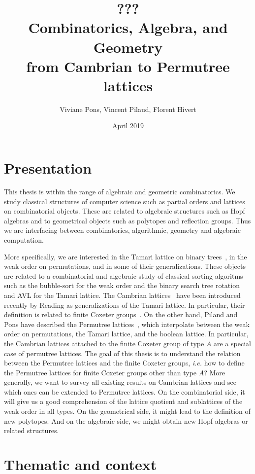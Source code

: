 \documentclass[a4paper,12pt]{article}
\title{\huge \bf ???  \\ Combinatorics, Algebra, and Geometry \\ from Cambrian to Permutree lattices}
\author{Viviane Pons, Vincent Pilaud, Florent Hivert}
\date{April 2019}
\begin{document}
\maketitle

\section{Presentation}

This thesis is within the range of algebraic and geometric combinatorics. We study classical structures of computer science such as partial orders and lattices on combinatorial objects. These are related to algebraic structures such as Hopf algebras and to geometrical objects such as polytopes and reflection groups. Thus we are interfacing between combinatorics, algorithmic, geometry and algebraic computation.

More specifically, we are interested in the Tamari lattice on binary trees~\cite{Tamari, HuangTamari, TamariFestschrift}, in the weak order on permutations, and in some of their generalizations. These objects are related to a combinatorial and algebraic study of classical sorting algoritms such as the bubble-sort for the weak order and the binary search tree rotation and AVL for the Tamari lattice. The Cambrian lattices~\cite{Reading-cambrianLattices} have been introduced recently by Reading as generalizations of the Tamari lattice. In particular, their definition is related to finite Coxeter groups~\cite{Reading-FiniteCoxeterGroupsChapter}. On the other hand, Piland and Pons have described the Permutree lattices~\cite{PilaudPons-permutrees}, which interpolate between the weak order on permutations, the Tamari lattice, and the boolean lattice. In particular, the Cambrian lattices attached to the finite Coxeter group of type $A$ are a special case of permutree lattices. The goal of this thesis is to understand the relation between the Permutree lattices and the finite Coxeter groups, \emph{i.e.} how to define the Permutree lattices for finite Coxeter groups other than type $A$? More generally, we want to survey all existing results on Cambrian lattices and see which ones can be extended to Permutree lattices. On the combinatorial side, it will give us a good comprehension of the lattice quotient and sublattices of the weak order in all types. On the geometrical side, it might lead to the definition of new polytopes. And on the algebraic side, we might obtain new Hopf algebras or related structures.

\section{Thematic and context}
\end{document}
